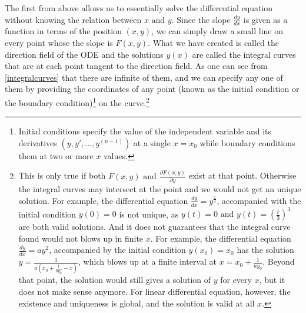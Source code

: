 \documentclass[english,a4paper,12pt]{report}
\begin{document}
The first from above allows us to essentially solve the differential equation without knowing the relation between \(x \text { and } y\). Since the slope \(\displaystyle \frac{dy}{dx} \) is given as a function in terms of the position \((x,y)\), we can simply draw a small line on every point whose the slope is \(F(x,y)\). What we have created is called the direction field of the ODE and the solutions \(y(x)\) are called the integral curves that are at each point tangent to the direction field. As one can see from \cref{integralcurves} that there are infinite of them, and we can specify any one of them by providing the coordinates of any point (known as the initial condition or the boundary condition)\footnote{Initial conditions specify the value of the independent variable and its derivatives \((y,y',\ldots ,y^{(n-1)} )\) at a single \(x = x_0 \) while boundary conditions them at two or more \(x\) values.} on the curve.\footnote{This is only true if both \(F(x,y) \text { and } \frac{\partial F(x,y)}{\partial y} \) exist at that point. Otherwise the integral curves may intersect at the point and we would not get an unique solution. For example, the differential equation \(\frac{dy}{dx} = y^{\frac{2}{3} } \), accompanied with the initial condition \(y(0) = 0\) is not unique, as \(y(t) = 0 \text { and } y(t) = (\frac{t}{3} )^3 \) are both valid solutions. And it does not guarantees that the integral curve found would not blows up in finite \(x\). For example, the differential equation \(\frac{dy}{dx} = ay^2 \), accompanied by the initial condition \(y(x_0 )= x_0 \) has the solution \(y = \frac{1}{a(x_0 +\frac{1}{ay_0 }-x )} \), which blows up at a finite interval at \(x = x_0 + \frac{1}{ay_0 } \). Beyond that point, the solution would still gives a solution of \(y\) for every \(x\), but it does not make sense anymore. For linear differential equation, however, the existence and uniqueness is global, and the solution is valid at all \(x\).} 

\end{document}

